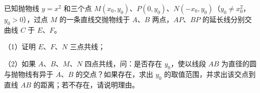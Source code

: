 \begin{question}
已知抛物线 $y=x^2$ 和三个点 $M(x_0,y_0)$、$P(0,y_0)$、$N(-x_0,y_0)$（$y_0\neq x_0^2$，$y_0>0$），过点 $M$ 的一条直线交抛物线于 $A$、$B$ 两点，$AP$、$BP$ 的延长线分别交曲线 $C$ 于 $E$、$F$。

（1）证明 $E$、$F$、$N$ 三点共线；

（2）如果 $A$、$B$、$M$、$N$ 四点共线，问：是否存在 $y_0$，使以线段 $AB$ 为直径的圆与抛物线有异于 $A$、$B$ 的交点？如果存在，求出 $y_0$ 的取值范围，并求出该交点到直线 $AB$ 的距离；若不存在，请说明理由。
\nopagebreak[4]
\begin{center}\end{center}
\nopagebreak[4]

\end{question}